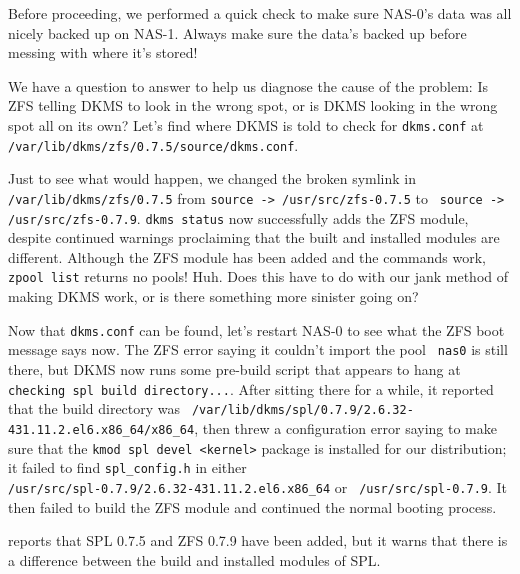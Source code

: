 \documentclass[12pt]{article}
\begin{document}
\begin{tcolorbox}[title=ASIDE, colback=white, colframe=blue]
  Before proceeding, we performed a quick check to make sure NAS-0's
  data was all nicely backed up on NAS-1. Always make sure the data's backed up
  before messing with where it's stored!
\end{tcolorbox}

\qq We have a question to answer to help us diagnose the cause of the problem:
Is ZFS telling DKMS to look in the wrong spot, or is DKMS looking in the wrong
spot all on its own? Let's find where DKMS is told to check for {\tt dkms.conf}
at {\tt /var/lib/dkms/zfs/0.7.5/source/dkms.conf}. 

\qq Just to see what would happen, we changed the broken symlink in {\tt
  /var/lib/dkms/zfs/0.7.5} from {\tt source -> /usr/src/zfs-0.7.5} to {\tt
  source -> /usr/src/zfs-0.7.9}. {\tt dkms status} now successfully adds the ZFS
module, despite continued warnings proclaiming that the built and installed
modules are different. Although the ZFS module has been added and the commands
work, {\tt zpool list} returns no pools! Huh. Does this have to do with our jank
method of making DKMS work, or is there something more sinister going on? 

\qq Now that {\tt dkms.conf} can be found, let's restart NAS-0 to see what the
ZFS boot message says now. The ZFS error saying it couldn't import the pool {\tt
  nas0} is still there, but DKMS now runs some pre-build script that appears to
hang at {\tt checking spl build directory...}. After sitting there for a while,
it reported that the build directory was {\tt
  /var/lib/dkms/spl/0.7.9/2.6.32-431.11.2.el6.x86\_64/x86\_64}, then threw a
configuration error saying to make sure that the {\tt kmod spl devel <kernel>}
package is installed for our distribution; it failed to find {\tt spl\_config.h}
in either\\ {\tt /usr/src/spl-0.7.9/2.6.32-431.11.2.el6.x86\_64} or {\tt
  /usr/src/spl-0.7.9}. It then failed to build the ZFS module and continued the
normal booting process. 

 reports that SPL 0.7.5 and ZFS 0.7.9 have been added, but
it warns that there is a difference between the build and installed modules of
SPL. 
\end{document}
